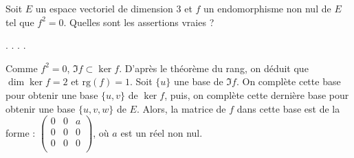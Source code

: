 \begin{question}
Soit $E$ un espace vectoriel de dimension $3$ et $f$ un endomorphisme non nul de $E$ tel que $f^2=0$. Quelles sont les assertions vraies ?
\begin{answers}  
.
.
.
.
\end{answers}
\begin{explanations} Comme $f^2=0$, $\Im f \subset \ker f$.
D'après le théorème du rang, on déduit que $\dim \ker f=2$ et $\mbox{rg} (f)=1$.
\vskip0mm
Soit $\{u\}$ une base de $\Im f$. On complète cette base pour obtenir une base $\{u,v\}$ de $\ker f$, puis, on complète cette 
dernière base pour obtenir une base $\{u,v,w\}$ de $E$. Alors, la matrice de $f$ dans cette base est de la forme :
$\left(\begin{array}{rcc}
0&0&a\\
0&0&0\\ 
0&0&0\\
\end{array}\right)$, où $a$ est un réel non nul.
\end{explanations}
\end{question}


